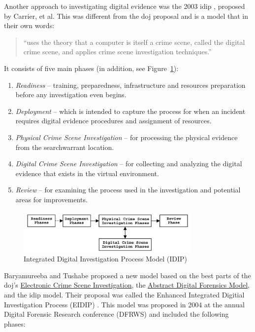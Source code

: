 \documentclass[12pt]{article}
\begin{document}
Another approach to investigating digital evidence was the 2003
\gls{idip} \cite{carrier2003getting},
proposed by Carrier, et al.  This was different from the \gls{doj} proposal and
is a model that in their own words:
\begin{quote}
``uses the theory that a computer is itself a crime scene,
called the digital crime scene, and applies crime scene
investigation techniques.''
\end{quote}
It consists of five main phases (in addition, see Figure~\ref{fig:IDIP}):

\vspace{0.5 cm}
\begin{enumerate}
  \item {\em Readiness} -- training, preparedness, infrastructure and resources
  preparation before any investigation even begins.
  \item {\em Deployment} -- which is intended to capture the process for when an 
  incident requires digital evidence procedures and assignment of resources.
  \item {\em Physical Crime Scene Investigation} -- for processing the physical
  evidence from the \gls{searchwarrant} location.
  \item {\em Digital Crime Scene Investigation} -- for collecting and
  analyzing the digital evidence that exists in the virtual environment.
  \item {\em Review} -- for examining the process used in the investigation and
  potential areas for improvements. 
\end{enumerate}
\vspace{0.5 cm}

\begin{figure}[H]
  \centering
    \includegraphics[width=0.8\textwidth]{images/IDIP.png}
  \caption{Integrated Digital Investigation Process Model (IDIP)}
  \label{fig:IDIP}
\end{figure}

Baryamureeba and Tushabe proposed a new model 
based on the best parts of the \gls{doj}'s \uline{Electronic Crime
Scene Investigation}, the \uline{Abstract Digital Forensics Model}, and 
the \gls{idip} model.  Their proposal was called the
Enhanced Integrated Digitial Investigation Process (EIDIP) \cite{baryamureeba2004enhanced}.
This model was proposed in 2004 at the annual Digital Forensic Research conference
(DFRWS) \cite{baryamureeba2004enhanced} and included the following phases:
\end{document}
